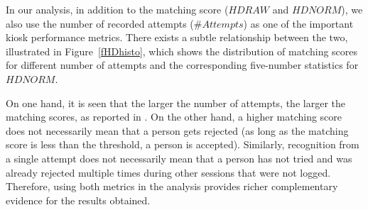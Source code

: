\documentclass{cta-author}%
\begin{document}

In our analysis, in addition to the matching score ($HDRAW$ and $HDNORM$), we also use the number of recorded attempts ($\# Attempts$) as one of the important kiosk performance metrics. 
There exists a subtle relationship between the two,  illustrated in Figure~\ref{fHDhisto}, which  
shows the distribution of matching scores for different number of attempts and the corresponding five-number statistics for $HDNORM$.%

On one hand, it is seen that the larger the number of attempts, the larger the matching scores, as reported in \cite{Bowyer-attempts}.
On the other hand, a higher matching score does not necessarily mean that a person gets rejected (as long as the matching score is less than the threshold, a person is accepted). Similarly, recognition from a single attempt does not necessarily mean that a person has not tried and was already rejected multiple times during other sessions that were not logged. 
Therefore, using both metrics in the analysis  provides richer complementary evidence for the results obtained.
\end{document}

